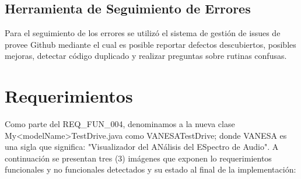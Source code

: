 \documentclass[10pt]{article} %
\begin{document}
\subsection{Herramienta de Seguimiento de Errores}
Para el seguimiento de los errores se utilizó el sistema de gestión de issues de provee Github mediante el cual es posible reportar defectos descubiertos, posibles mejoras, detectar código duplicado y realizar preguntas sobre rutinas confusas.



\section{Requerimientos}
Como parte del REQ\_FUN\_004, denominamos a la nueva clase My<modelName>TestDrive.java como VANESATestDrive; donde VANESA es una sigla que significa: "Visualizador del ANálisis del ESpectro de Audio". A continuación se presentan tres (3) imágenes que exponen lo requerimientos funcionales y no funcionales detectados y su estado al final de la implementación:

\begin{figure}[H] %
\label{fig:Diagrama_de_Requerimientos1a}
\end{figure}
\end{document}
